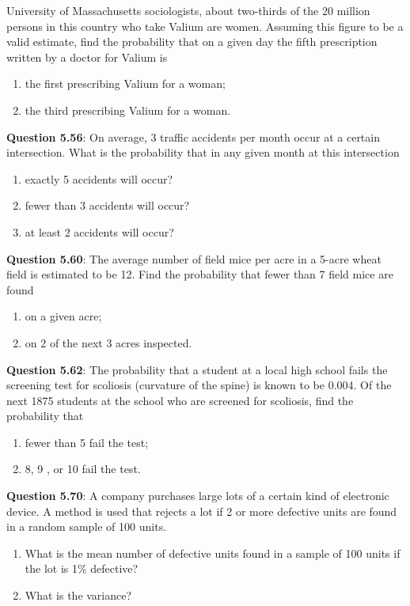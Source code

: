 \documentclass{article}
\begin{document}
    University of Massachusetts sociologists, about two-thirds 
    of the 20 million persons in this country who
    take Valium are women. Assuming this figure to be a
    valid estimate, find the probability that on a given day
    the fifth prescription written by a doctor for Valium is
        \begin{enumerate}[label = (\alph*)]
            \item the first prescribing Valium for a woman;
            \item the third prescribing Valium for a woman.
        \end{enumerate}
    \textbf{Question 5.56}: On average, 3 traffic accidents per month occur
    at a certain intersection. What is the probability that
    in any given month at this intersection
        \begin{enumerate}[label = (\alph*)]
            \item exactly 5 accidents will occur?
            \item fewer than 3 accidents will occur?
            \item at least 2 accidents will occur?
        \end{enumerate}
    \textbf{Question 5.60}: The average number of field mice per acre in
    a 5-acre wheat field is estimated to be 12. Find the
    probability that fewer than 7 field mice are found
        \begin{enumerate}[label = (\alph*)]
            \item on a given acre;
            \item on 2 of the next 3 acres inspected.
        \end{enumerate}
    \textbf{Question 5.62}: The probability that a student at a local high
    school fails the screening test for scoliosis (curvature
    of the spine) is known to be 0.004. Of the next 1875
    students at the school who are screened for scoliosis, find the probability that
        \begin{enumerate}[label = (\alph*)]
            \item fewer than 5 fail the test;
            \item 8, 9 , or 10 fail the test.
        \end{enumerate}
    \textbf{Question 5.70}: A company purchases large lots of a certain kind
    of electronic device. A method is used that rejects a
    lot if 2 or more defective units are found in a random
    sample of 100 units.
        \begin{enumerate}[label = (\alph*)]
            \item What is the mean number of defective units found
            in a sample of 100 units if the lot is 1\% defective?
            \item What is the variance?
        \end{enumerate}
\end{document}
